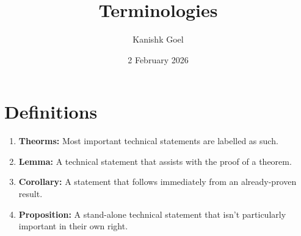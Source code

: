 \documentclass{article}
\title{Terminologies}
\author{Kanishk Goel}
\date{2 February 2026}
\begin{document}
	\maketitle
	\section{Definitions}
	\begin{enumerate}
		\item \textbf{Theorms:} Most important technical statements are labelled as such.
		\item \textbf{Lemma:} A technical statement that assists with the proof of a theorem.
		\item \textbf{Corollary:} A statement that follows immediately from an already-proven result.
		\item \textbf{Proposition:} A stand-alone technical statement that isn't particularly important in their own right.
 	\end{enumerate}
\end{document}
